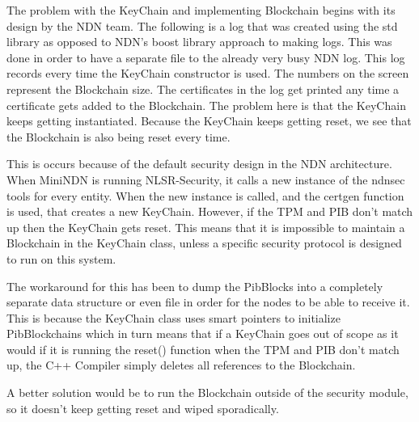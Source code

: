 The problem with the KeyChain and implementing Blockchain begins with its design by the NDN team. The following is a log that was created using the std library as opposed to NDN's boost library approach to making logs. This was done in order to have a separate file to the already very busy NDN log. This log records every time the KeyChain constructor is used. The numbers on the screen represent the Blockchain size. The certificates in the log get printed any time a certificate gets added to the Blockchain. The problem here is that the KeyChain keeps getting instantiated. Because the KeyChain keeps getting reset, we see that the Blockchain is also being reset every time. \par 

This is occurs because of the default security design in the NDN architecture. When MiniNDN is running NLSR-Security, it calls a new instance of the ndnsec tools for every entity. When the new instance is called, and the certgen function is used, that creates a new KeyChain. However, if the TPM and PIB don't match up then the KeyChain gets reset. This means that it is impossible to maintain a Blockchain in the KeyChain class, unless a specific security protocol is designed to run on this system. \par 

The workaround for this has been to dump the PibBlocks into a completely separate data structure or even file in order for the nodes to be able to receive it. This is because the KeyChain class uses smart pointers to initialize PibBlockchains which in turn means that if a KeyChain goes out of scope as it would if it is running the reset() function when the TPM and PIB don't match up, the C++ Compiler simply deletes all references to the Blockchain. \par

A better solution would be to run the Blockchain outside of the security module, so it doesn't keep getting reset and wiped sporadically. 


